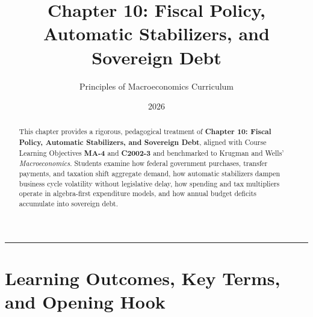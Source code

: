 \documentclass[11pt,letterpaper]{article}
\begin{document}
\title{\Huge\bfseries\color{SlateBlue} Chapter 10: Fiscal Policy, Automatic Stabilizers, and Sovereign Debt}
\author{\large Principles of Macroeconomics Curriculum}
\date{2026}
\maketitle

\thispagestyle{plain}

\begin{abstract}
This chapter provides a rigorous, pedagogical treatment of \textbf{Chapter 10: Fiscal Policy, Automatic Stabilizers, and Sovereign Debt}, aligned with Course Learning Objectives \textbf{MA-4} and \textbf{C2002-3} and benchmarked to Krugman and Wells' \emph{Macroeconomics}. Students examine how federal government purchases, transfer payments, and taxation shift aggregate demand, how automatic stabilizers dampen business cycle volatility without legislative delay, how spending and tax multipliers operate in algebra-first expenditure models, and how annual budget deficits accumulate into sovereign debt.
\end{abstract}

\tableofcontents
\vspace{1.5em}
\hrule
\vspace{1.5em}

\section{Learning Outcomes, Key Terms, and Opening Hook}
\end{document}
